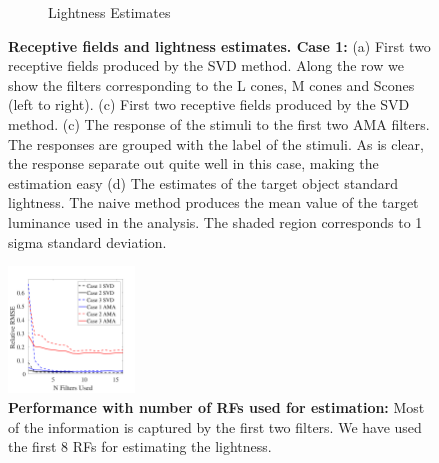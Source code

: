 \documentclass{jov}
\begin{document}
\begin{figure}
\begin{subfigure}[b]{0.20 \textwidth}
        \caption{Lightness Estimates}
        \label{fig:case9Results}
    \end{subfigure}    
    \caption{{\bf Receptive fields and lightness estimates. Case 1:} (a) First two receptive fields produced by the SVD method. Along the row we show the filters corresponding to the L cones, M cones and Scones (left to right). (c) First two receptive fields produced by the SVD method. (c) The response of the stimuli to the first two AMA filters. The responses are grouped with the label of the stimuli. As is clear, the response separate out quite well in this case, making the estimation easy (d) The estimates of the target object standard lightness. The naive method produces the mean value of the target luminance used in the analysis. The shaded region corresponds to 1 sigma standard deviation.}
\label{fig:case9AllResults}
\end{figure}

\begin{figure}
\centering
\includegraphics[width=0.3\textwidth]{../Figures/Figure11/Figure11.pdf}
\caption{{\bf Performance with number of RFs used for estimation:} Most of the information is captured by the first two filters. We have used the first 8 RFs for estimating the lightness.}
\label{fig:RMSEvsNFilters}
\end{figure}
\end{document}
